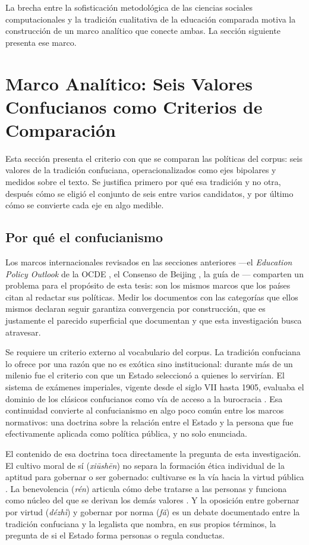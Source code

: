 La brecha entre la sofisticación metodológica de las ciencias sociales computacionales y la tradición cualitativa de la educación comparada motiva la construcción de un marco analítico que conecte ambas. La sección siguiente presenta ese marco.


\section{Marco Analítico: Seis Valores Confucianos como Criterios de Comparación}
\label{sec:marco-analitico}

Esta sección presenta el criterio con que se comparan las políticas del corpus: seis valores de la tradición confuciana, operacionalizados como ejes bipolares y medidos sobre el texto. Se justifica primero por qué esa tradición y no otra, después cómo se eligió el conjunto de seis entre varios candidatos, y por último cómo se convierte cada eje en algo medible.


\subsection{Por qué el confucianismo}

Los marcos internacionales revisados en las secciones anteriores ---el \textit{Education Policy Outlook} de la OCDE \citep{oecd2021epo}, el Consenso de Beijing \citep{unesco2019beijing}, la guía de \citet{miao2021guidance}--- comparten un problema para el propósito de esta tesis: son los mismos marcos que los países citan al redactar sus políticas. Medir los documentos con las categorías que ellos mismos declaran seguir garantiza convergencia por construcción, que es justamente el parecido superficial que \citet{bareis2022talking} documentan y que esta investigación busca atravesar.

Se requiere un criterio externo al vocabulario del corpus. La tradición confuciana lo ofrece por una razón que no es exótica sino institucional: durante más de un milenio fue el criterio con que un Estado seleccionó a quienes lo servirían. El sistema de exámenes imperiales, vigente desde el siglo VII hasta 1905, evaluaba el dominio de los clásicos confucianos como vía de acceso a la burocracia \citep{elman2013civil}. Esa continuidad convierte al confucianismo en algo poco común entre los marcos normativos: una doctrina sobre la relación entre el Estado y la persona que fue efectivamente aplicada como política pública, y no solo enunciada.

El contenido de esa doctrina toca directamente la pregunta de esta investigación. El cultivo moral de sí (\textit{xiūshēn}) no separa la formación ética individual de la aptitud para gobernar o ser gobernado: cultivarse es la vía hacia la virtud pública \citep{ivanhoe2000confucian}. La benevolencia (\textit{rén}) articula cómo debe tratarse a las personas y funciona como núcleo del que se derivan los demás valores \citep{csikszentmihalyi2024confucius}. Y la oposición entre gobernar por virtud (\textit{dézhì}) y gobernar por norma (\textit{fǎ}) es un debate documentado entre la tradición confuciana y la legalista \citep{pines2023legalism} que nombra, en sus propios términos, la pregunta de si el Estado forma personas o regula conductas.

